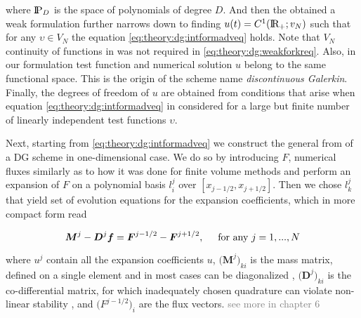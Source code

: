 \documentclass[11pt,a4paper,headinclude=true,DIV=14,BCOR=8mm,chapterprefix,listof=totoc,twoside,openright,abstracton]{scrbook}
\begin{document}
where $\text{I\!P}_{D}$ is the space of polynomials of degree $D$. And then the obtained a weak formulation further narrows down to finding $u(t) = C^1(\text{I\!R}_{+};v_N)$ such that for any $ \upsilon\in V_N $ the equation \ref{eq:theory:dg:intformadveq} holds. Note that $V_N$ continuity of functions in was not required in \ref{eq:theory:dg:weakforkreq}. Also, in our formulation test function and numerical solution $u$ belong to the same functional space. This is the origin of the scheme name \textit{discontinuous Galerkin}. Finally, the degrees of freedom of $u$ are obtained from conditions that arise when equation \ref{eq:theory:dg:intformadveq} in considered for a large but finite number of linearly independent test functions $\upsilon$. 

Next, starting from \ref{eq:theory:dg:intformadveq} we construct the general from of a DG scheme in one-dimensional case. We do so by introducing $F$, numerical fluxes similarly as to how it was done for finite volume methods and perform an expansion of $F$ on a polynomial basis $l_{i}^{j}$ over $[x_{j-1/2}, x_{j+1/2}]$. Then we chose $l_{k}^{j}$ that yield set of evolution equations for the expansion coefficients, which in more compact form read

\begin{equation}
\boldsymbol{M}^{j} - \boldsymbol{D}^{j}\boldsymbol{f} = \boldsymbol{F}^{j-1/2} - \boldsymbol{F}^{j+1/2}, \hspace{5mm} \text{for any } j=1,...,N \\
\end{equation}

where $u^{j}$ contain all the expansion coefficients $u$,  $\big(\boldsymbol{M}^j\big)_{ki}$ is the mass matrix, defined on a single element and in most cases can be diagonalized \cite{Canuto:2008}, $\big(\boldsymbol{D}^{j}\big)_{ki}$ is the co-differential matrix, for which inadequately chosen quadrature can violate non-linear stability \cite{Hesthaven:2007}, and $\big(F^{j-1/2}\big)_i$ are the flux vectors. \textcolor{gray}{see more in chapter 6}




\newpage


\end{document}
